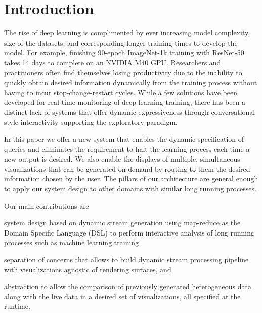 \documentclass[sigchi]{acmart} %
\begin{document}
%

\maketitle

\section{Introduction}
The rise of deep learning is complimented by ever increasing model complexity, size of the datasets, and corresponding longer training times to develop the model. For example, finishing 90-epoch ImageNet-1k training with ResNet-50 takes 14 days to complete on an NVIDIA M40 GPU\cite{You:2018:ITM:3225058.3225069}. Researchers and practitioners often find themselves losing productivity due to the inability to quickly obtain desired information dynamically from the training process without having to incur stop-change-restart cycles.  While a few solutions have been developed for real-time monitoring of deep learning training, there has been a distinct lack of systems that offer dynamic expressiveness through conversational style interactivity supporting the exploratory paradigm.

In this paper we offer a new system that enables the dynamic specification of queries and eliminates the requirement to halt the learning process each time a new output is desired. We also enable the displays of multiple, simultaneous visualizations that can be generated on-demand by routing to them the desired information chosen by the user. The pillars of our architecture are general enough to apply our system design to other domains with similar long running processes.

Our main contributions are
\begin{enumerate*}
\item system design based on dynamic stream generation using map-reduce as the Domain Specific Language (DSL) to perform interactive analysis of long running processes such as machine learning training
\item separation of concerns that allows to build dynamic stream processing pipeline with visualizations agnostic of rendering surfaces, and 
\item abstraction to allow the comparison of previously generated heterogeneous data along with the live data in a desired set of visualizations, all specified at the runtime.
\end{enumerate*}
\end{document}
